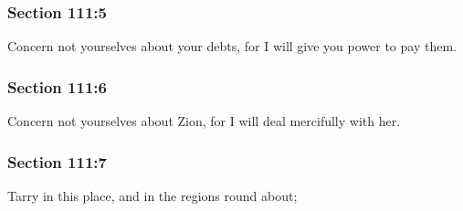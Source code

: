 	\subsubsection{Section 111:5} %
		\label{DC111-5}

		Concern not yourselves about your debts, for I will give you power to pay them.


	\subsubsection{Section 111:6} %
		\label{DC111-6}

		Concern not yourselves about Zion, for I will deal mercifully with her.


	\subsubsection{Section 111:7} %
		\label{DC111-7}

		Tarry in this place, and in the regions round about;


